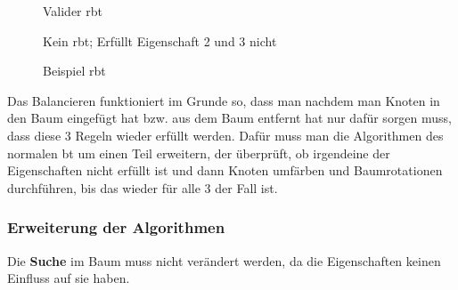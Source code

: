 \documentclass[11pt]{article}
\begin{document}
\begin{figure}[h]
\begin{minipage}[t]{.45\linewidth}
  \centering
  \caption{Valider \gls{rbt}}
  \end{minipage}
  \hfill
  \begin{minipage}[t]{.45\linewidth}
  \centering
  \caption{Kein \gls{rbt}; Erfüllt Eigenschaft 2 und 3 nicht}
  \end{minipage}
  
  \caption{Beispiel \gls{rbt}}
\end{figure}
  

Das Balancieren funktioniert im Grunde so, dass man nachdem man Knoten in den Baum eingefügt hat 
bzw. aus dem Baum entfernt hat nur dafür sorgen muss, dass diese 3 Regeln wieder erfüllt werden. 
Dafür muss man die Algorithmen des normalen \gls{bt} um einen Teil erweitern, der überprüft, 
ob irgendeine der Eigenschaften nicht erfüllt ist und dann Knoten umfärben und Baumrotationen durchführen, bis das wieder für alle 3 der Fall ist. 

\subsubsection{Erweiterung der Algorithmen}

Die \textbf{Suche} im Baum muss nicht verändert werden, da die Eigenschaften keinen Einfluss auf sie haben. \cite[S. 221]{aic}
\end{document}
